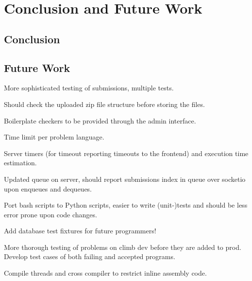\chapter{Conclusion and Future Work}
\label{ch:conclusion}

\section{Conclusion}

\section{Future Work}
\label{sec:future-work}

More sophisticated testing of submissions, multiple tests.

Should check the uploaded zip file structure before storing the files.

Boilerplate checkers to be provided through the admin interface.

Time limit per problem language.

Server timers (for timeout reporting timeouts to the frontend) and execution time estimation.

Updated queue on server, should report submissions index in queue over socketio upon enqueues and dequeues.

Port bash scripts to Python scripts, easier to write (unit-)tests and should be less error prone upon code changes.

Add database test fixtures for future programmers!

More thorough testing of problems on climb dev before they are added to prod. Develop test cases of both failing and accepted programs.

Compile threads and cross compiler to restrict inline assembly code.
